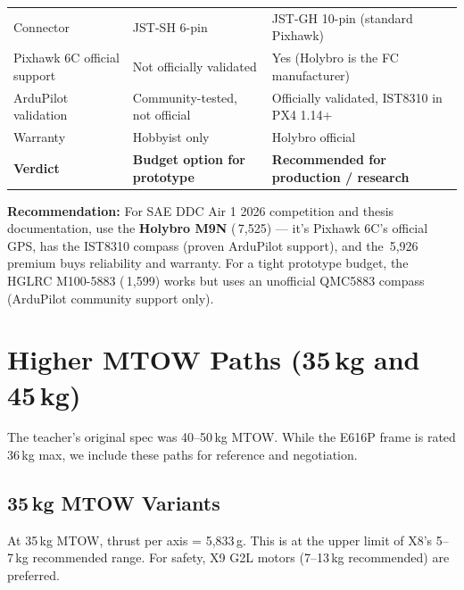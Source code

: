 \documentclass[11pt,a4paper]{article}
\newcommand{\Rs}{\rupee\,}
\begin{document}
\begin{xltabular}{\linewidth}{L{3.0cm}L{4.5cm}L{4.5cm}@{}}
Connector                    & JST-SH 6-pin                    & JST-GH 10-pin (standard Pixhawk) \\
Pixhawk 6C official support  & Not officially validated        & Yes (Holybro is the FC manufacturer) \\
ArduPilot validation         & Community-tested, not official  & Officially validated, IST8310 in PX4 1.14+ \\
Warranty                     & Hobbyist only                   & Holybro official \\
\midrule
\textbf{Verdict} & \textbf{Budget option for prototype} & \textbf{Recommended for production / research} \\
\bottomrule
\end{xltabular}

\noindent \textbf{Recommendation:} For SAE DDC Air 1 2026 competition and thesis documentation, use the \textbf{Holybro M9N} (\Rs{}7,525) --- it's Pixhawk 6C's official GPS, has the IST8310 compass (proven ArduPilot support), and the \Rs{}5,926 premium buys reliability and warranty. For a tight prototype budget, the HGLRC M100-5883 (\Rs{}1,599) works but uses an unofficial QMC5883 compass (ArduPilot community support only).

\section{Higher MTOW Paths (35\,kg and 45\,kg)}

The teacher's original spec was 40--50\,kg MTOW. While the E616P frame is rated 36\,kg max, we include these paths for reference and negotiation.

\subsection{35\,kg MTOW Variants}

At 35\,kg MTOW, thrust per axis = 5,833\,g. This is at the upper limit of X8's 5--7\,kg recommended range. For safety, X9 G2L motors (7--13\,kg recommended) are preferred.
\end{document}
